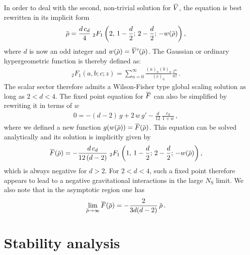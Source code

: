 \documentclass[11pt]{book}
\newcommand{\overbar}[1]{\mkern 1.5mu\overline{\mkern-1.5mu#1\mkern-1.5mu}\mkern 1.5mu}
\newcommand\NS{ N_{\scriptscriptstyle{\mathrm{S}}} }
\newcommand{\bV}{\overbar V}
\newcommand{\bF}{\overbar F}
\newcommand{\brho}{\overbar \rho}
\numberwithin{equation}{chapter}
\begin{document}
In order to deal with the second, non-trivial solution for $\bV$,
the equation is best rewritten in its implicit form
\begin{align}
  \brho = \frac{d \, c_d}{4} \;
  _2F_1 \left( 2,\, 1 - \frac{d}{2};\, 2 - \frac{d}{2};\, -w(\brho) \right) ,
\end{align}
where $d$ is now an odd integer and $w(\brho)=\bV'(\brho)$.
The Gaussian or ordinary hypergeometric function is thereby defined as:
\begin{align}
  {}_2F_1(a,b;c;z) = \sum_{n=0}^\infty \frac{(a)_n (b)_n}{(c)_n} \frac{z^n}{n!} \,.
\end{align}
The scalar sector therefore admits a Wilson-Fisher type global scaling solution as long as $2<d<4$.
The fixed point equation for $\bF$ can also be simplified by rewriting it in terms of $w$
\begin{align}
  0 = -(d-2) \, g + 2 \, w \, g' - \frac{d}{12} \, \frac{c_d}{1+w} \,,
\end{align}
where we defined a new function $g(w(\brho)) = \bF (\brho)$.
This equation can be solved analytically and its solution is implicitly given by
\begin{align}
  \bF(\brho) = - \frac{d \, c_d}{12 \, (d-2)} \;
  _2F_1\left( 1,\, 1 - \frac{d}{2};\, 2 - \frac{d}{2};\, -w(\brho) \right) ,
\end{align}
which is always negative for $d>2$. For $2<d<4$, such a fixed point therefore appears
to lead to a negative gravitational interactions in the large $\NS$ limit.
We also note that in the asymptotic region one has
\begin{align}
  \lim_{\brho \to \infty} \bF(\brho)= -\frac{ 2 }{ 3 d (d-2) } \, \brho \,.
\end{align}


\section{Stability analysis}
\end{document}
